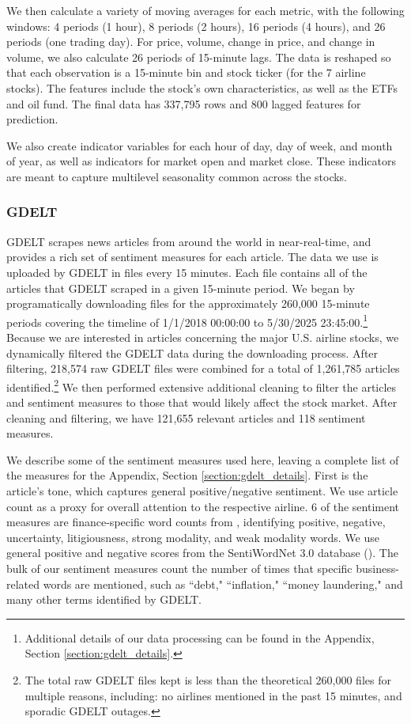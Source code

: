 \documentclass[12pt]{article}
\begin{document}
We then calculate a variety of moving averages for each metric, with the following windows: 4 periods (1 hour), 8 periods (2 hours), 16 periods (4 hours), and 26 periods (one trading day). For price, volume, change in price, and change in volume, we also calculate 26 periods of 15-minute lags. The data is reshaped so that each observation is a 15-minute bin and stock ticker (for the 7 airline stocks). The features include the stock's own characteristics, as well as the ETFs and oil fund. The final data has 337,795 rows and 800 lagged features for prediction.

We also create indicator variables for each hour of day, day of week, and month of year, as well as indicators for market open and market close. These indicators are meant to capture multilevel seasonality common across the stocks.

\subsubsection{GDELT}
GDELT scrapes news articles from around the world in near-real-time, and provides a rich set of sentiment measures for each article. The data we use is uploaded by GDELT in files every 15 minutes. Each file contains all of the articles that GDELT scraped in a given 15-minute period. We began by programatically downloading files for the approximately 260,000 15-minute periods covering the timeline of 1/1/2018 00:00:00 to 5/30/2025 23:45:00.\footnote{Additional details of our data processing can be found in the Appendix, Section \ref{section:gdelt_details}.} Because we are interested in articles concerning the major U.S. airline stocks, we dynamically filtered the GDELT data during the downloading process. After filtering, 218,574 raw GDELT files were combined for a total of 1,261,785 articles identified.\footnote{The total raw GDELT files kept is less than the theoretical 260,000 files for multiple reasons, including: no airlines mentioned in the past 15 minutes, and sporadic GDELT outages.} We then performed extensive additional cleaning to filter the articles and sentiment measures to those that would likely affect the stock market. After cleaning and filtering, we have 121,655 relevant articles and 118 sentiment measures.

We describe some of the sentiment measures used here, leaving a complete list of the measures for the Appendix, Section \ref{section:gdelt_details}. First is the article's tone, which captures general positive/negative sentiment. We use article count as a proxy for overall attention to the respective airline. 6 of the sentiment measures are finance-specific word counts from \textcite{loughran2011liability}, identifying positive, negative, uncertainty, litigiousness, strong modality, and weak modality words. We use general positive and negative scores from the SentiWordNet 3.0 database (\textcite{baccianella2010sentiwordnet}). The bulk of our sentiment measures count the number of times that specific business-related words are mentioned, such as ``debt," ``inflation," ``money laundering," and many other terms identified by GDELT.
\end{document}
